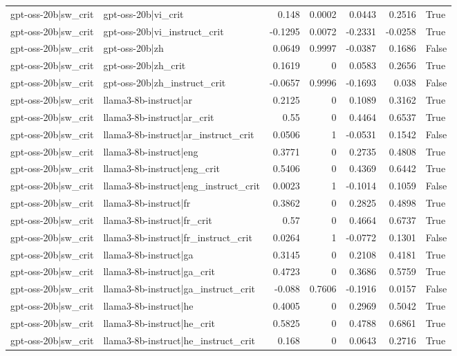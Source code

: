\begin{table}
\begin{tabular}{l l r r r r l}
gpt-oss-20b|sw_crit & gpt-oss-20b|vi_crit & 0.148 & 0.0002 & 0.0443 & 0.2516 & True \\
gpt-oss-20b|sw_crit & gpt-oss-20b|vi_instruct_crit & -0.1295 & 0.0072 & -0.2331 & -0.0258 & True \\
gpt-oss-20b|sw_crit & gpt-oss-20b|zh & 0.0649 & 0.9997 & -0.0387 & 0.1686 & False \\
gpt-oss-20b|sw_crit & gpt-oss-20b|zh_crit & 0.1619 & 0 & 0.0583 & 0.2656 & True \\
gpt-oss-20b|sw_crit & gpt-oss-20b|zh_instruct_crit & -0.0657 & 0.9996 & -0.1693 & 0.038 & False \\
gpt-oss-20b|sw_crit & llama3-8b-instruct|ar & 0.2125 & 0 & 0.1089 & 0.3162 & True \\
gpt-oss-20b|sw_crit & llama3-8b-instruct|ar_crit & 0.55 & 0 & 0.4464 & 0.6537 & True \\
gpt-oss-20b|sw_crit & llama3-8b-instruct|ar_instruct_crit & 0.0506 & 1 & -0.0531 & 0.1542 & False \\
gpt-oss-20b|sw_crit & llama3-8b-instruct|eng & 0.3771 & 0 & 0.2735 & 0.4808 & True \\
gpt-oss-20b|sw_crit & llama3-8b-instruct|eng_crit & 0.5406 & 0 & 0.4369 & 0.6442 & True \\
gpt-oss-20b|sw_crit & llama3-8b-instruct|eng_instruct_crit & 0.0023 & 1 & -0.1014 & 0.1059 & False \\
gpt-oss-20b|sw_crit & llama3-8b-instruct|fr & 0.3862 & 0 & 0.2825 & 0.4898 & True \\
gpt-oss-20b|sw_crit & llama3-8b-instruct|fr_crit & 0.57 & 0 & 0.4664 & 0.6737 & True \\
gpt-oss-20b|sw_crit & llama3-8b-instruct|fr_instruct_crit & 0.0264 & 1 & -0.0772 & 0.1301 & False \\
gpt-oss-20b|sw_crit & llama3-8b-instruct|ga & 0.3145 & 0 & 0.2108 & 0.4181 & True \\
gpt-oss-20b|sw_crit & llama3-8b-instruct|ga_crit & 0.4723 & 0 & 0.3686 & 0.5759 & True \\
gpt-oss-20b|sw_crit & llama3-8b-instruct|ga_instruct_crit & -0.088 & 0.7606 & -0.1916 & 0.0157 & False \\
gpt-oss-20b|sw_crit & llama3-8b-instruct|he & 0.4005 & 0 & 0.2969 & 0.5042 & True \\
gpt-oss-20b|sw_crit & llama3-8b-instruct|he_crit & 0.5825 & 0 & 0.4788 & 0.6861 & True \\
gpt-oss-20b|sw_crit & llama3-8b-instruct|he_instruct_crit & 0.168 & 0 & 0.0643 & 0.2716 & True \\

\end{tabular}
\end{table}
